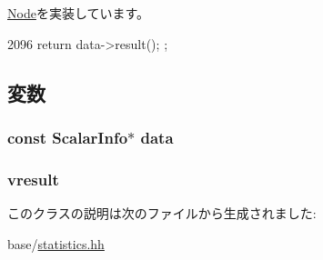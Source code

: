 \hyperlink{classStats_1_1Node_ab152b7e89b37a7db03b04d500ceb8349}{Node}を実装しています。


\begin{DoxyCode}
2096 { return data->result(); };
\end{DoxyCode}


\subsection{変数}
\hypertarget{classStats_1_1ScalarStatNode_af5e53ba08d05b6fbfbae1ca8405fa350}{
\subsubsection[{data}]{\setlength{\rightskip}{0pt plus 5cm}const {\bf ScalarInfo}$\ast$ {\bf data}}}
\label{classStats_1_1ScalarStatNode_af5e53ba08d05b6fbfbae1ca8405fa350}
\hypertarget{classStats_1_1ScalarStatNode_a8f41af856442757ec68f3391333d3eb2}{
\subsubsection[{vresult}]{ {\bf vresult}}}
\label{classStats_1_1ScalarStatNode_a8f41af856442757ec68f3391333d3eb2}


このクラスの説明は次のファイルから生成されました:\begin{DoxyCompactItemize}
\item 
base/\hyperlink{statistics_8hh}{statistics.hh}\end{DoxyCompactItemize}
